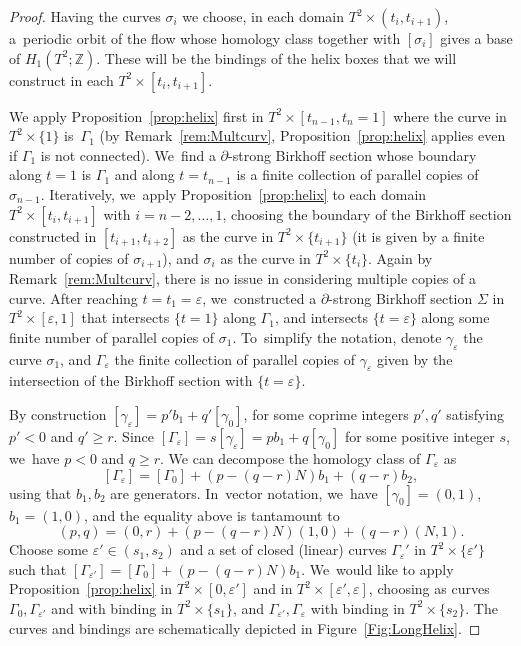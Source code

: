 \documentclass[11pt]{article}
\theoremstyle{definition}
\begin{document}
\begin{proof}
Having the curves $\sigma_i$ we choose, in each domain $T^2\times (t_i, t_{i+1})$, a~periodic orbit of the flow whose homology class together with $[\sigma_i]$ gives a base of $H_1(T^2;\mathbb{Z})$. These will be the bindings of the helix boxes that we will construct in each $T^2\times [t_i, t_{i+1}]$.

We apply Proposition~\ref{prop:helix} first in $T^2\times [t_{n-1},t_n=1]$ where the curve in $T^2\times \{1\}$ is~$\Gamma_1$ (by Remark~\ref{rem:Multcurv}, Proposition~\ref{prop:helix} applies even if $\Gamma_1$ is not connected). We~find a $\partial$-strong Birkhoff section whose boundary along $t=1$ is $\Gamma_1$ and along $t=t_{n-1}$ is a finite collection of parallel copies of $\sigma_{n-1}$. Iteratively, we~apply Proposition~\ref{prop:helix} to each domain $T^2\times [t_i,t_{i+1}]$ with $i=n-2,\dots,1$, choosing the boundary of the Birkhoff section constructed in $[t_{i+1},t_{i+2}]$ as the curve in $T^2\times \{t_{i+1}\}$ (it is given by a finite number of copies of $\sigma_{i+1}$), and $\sigma_i$ as the curve in $T^2\times \{t_i\}$. Again by Remark~\ref{rem:Multcurv}, there is no issue in considering multiple copies of a curve. After reaching $t=t_1=\varepsilon$, we~constructed a $\partial$-strong Birkhoff section $\Sigma$ in $T^2\times [\varepsilon,1]$ that intersects $\{t=1\}$ along $\Gamma_1$, and intersects $\{t=\varepsilon\}$ along some finite number of parallel copies of $\sigma_1$. To~simplify the notation, denote $\gamma_\varepsilon$ the curve $\sigma_1$, and $\Gamma_\varepsilon$ the finite collection of parallel copies of $\gamma_\varepsilon$ given by the intersection of the Birkhoff section with $\{t=\varepsilon\}$.

By construction $[\gamma_\varepsilon]= p' b_1 + q' [\gamma_0]$,
for some coprime integers $p',q'$ satisfying $p'<0$ and $q'\geq r$. Since
$[\Gamma_\varepsilon]= s[\gamma_\varepsilon]=pb_1+q[\gamma_0]$
for some positive integer $s$, we~have $p<0$ and $q\geq r$.
We can decompose the homology class of $\Gamma_\varepsilon$ as
\[
[\Gamma_\varepsilon]= [\Gamma_0] + (p-(q-r)N)b_1 + (q-r)b_2,
\]
using that $b_1,b_2$ are generators. In~vector notation, we~have $[\gamma_0]=(0,1)$, $b_1=(1,0)$, and the equality above is tantamount to
\[
(p,q)= (0,r) + (p-(q-r)N)(1,0) + (q-r) (N,1).
\]
Choose some $\varepsilon'\in (s_1,s_2)$ and a set of closed (linear) curves $\Gamma_\varepsilon'$ in $T^2\times \{\varepsilon'\}$ such that $[\Gamma_{\varepsilon'}]=[\Gamma_0]+(p-(q-r)N)b_1$. We~would like to apply Proposition~\ref{prop:helix} in $T^2\times [0,\varepsilon']$ and in $T^2\times [\varepsilon',\varepsilon]$, choosing as curves $\Gamma_0, \Gamma_{\varepsilon'}$ and with binding in $T^2\times \{s_1\}$, and $\Gamma_{\varepsilon'}, \Gamma_{\varepsilon}$ with binding in $T^2\times \{s_2\}$. The curves and bindings are schematically depicted in Figure~\ref{Fig:LongHelix}.


\end{proof}
\end{document}
